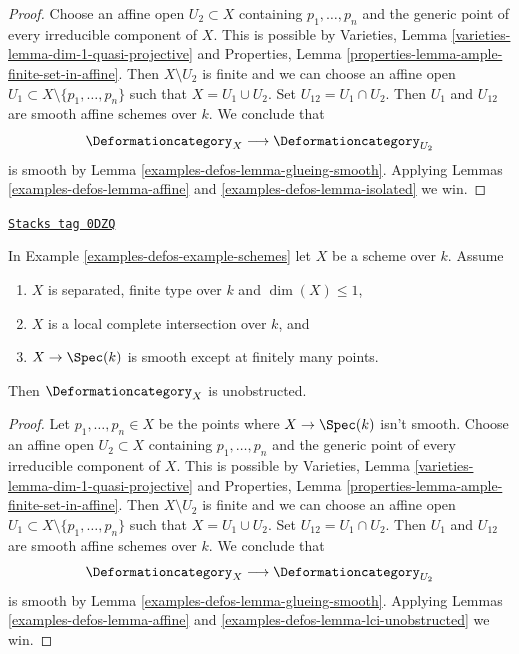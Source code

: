 \begin{proof}
Choose an affine open $U_2 \subset X$ containing
$p_1, \ldots, p_n$ and the generic point of every irreducible
component of $X$. This is possible by
Varieties, Lemma \ref{varieties-lemma-dim-1-quasi-projective}
and Properties, Lemma \ref{properties-lemma-ample-finite-set-in-affine}.
Then $X \setminus U_2$ is finite and we can choose an affine open
$U_1 \subset X \setminus \{p_1, \ldots, p_n\}$ such that
$X = U_1 \cup U_2$. Set $U_{12} = U_1 \cap U_2$.
Then $U_1$ and $U_{12}$ are smooth affine schemes over $k$.
We conclude that
$$
\Deformationcategory_X \longrightarrow \Deformationcategory_{U_2}
$$
is smooth by Lemma \ref{examples-defos-lemma-glueing-smooth}.
Applying Lemmas \ref{examples-defos-lemma-affine} and \ref{examples-defos-lemma-isolated} we win.
\end{proof}

\begin{lemma}
\label{examples-defos-lemma-curve-isolated-lci}
\href{https://stacks.math.columbia.edu/tag/0DZQ}{\texttt{Stacks tag 0DZQ}}

In Example \ref{examples-defos-example-schemes} let $X$ be a scheme over $k$. Assume
\begin{enumerate}
\item $X$ is separated, finite type over $k$ and $\dim(X) \leq 1$,
\item $X$ is a local complete intersection over $k$, and
\item $X \to \Spec(k)$ is smooth except at finitely many points.
\end{enumerate}
Then $\Deformationcategory_X$ is unobstructed.
\end{lemma}

\begin{proof}
Let $p_1, \ldots, p_n \in X$ be the points where $X \to \Spec(k)$
isn't smooth. Choose an affine open $U_2 \subset X$ containing
$p_1, \ldots, p_n$ and the generic point of every irreducible
component of $X$. This is possible by
Varieties, Lemma \ref{varieties-lemma-dim-1-quasi-projective}
and Properties, Lemma \ref{properties-lemma-ample-finite-set-in-affine}.
Then $X \setminus U_2$ is finite and we can choose an affine open
$U_1 \subset X \setminus \{p_1, \ldots, p_n\}$ such that
$X = U_1 \cup U_2$. Set $U_{12} = U_1 \cap U_2$.
Then $U_1$ and $U_{12}$ are smooth affine schemes over $k$.
We conclude that
$$
\Deformationcategory_X \longrightarrow \Deformationcategory_{U_2}
$$
is smooth by Lemma \ref{examples-defos-lemma-glueing-smooth}.
Applying Lemmas \ref{examples-defos-lemma-affine} and \ref{examples-defos-lemma-lci-unobstructed} we win.
\end{proof}

